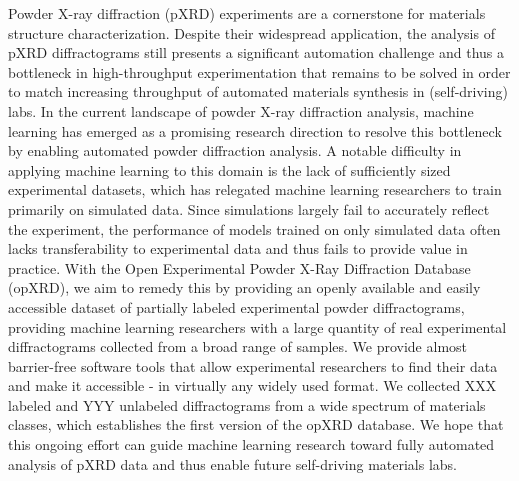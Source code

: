 Powder X-ray diffraction (pXRD) experiments are a cornerstone for materials structure characterization.
Despite their widespread application, the analysis of pXRD diffractograms still presents a significant automation challenge and thus a bottleneck in high-throughput experimentation that remains to be solved in order to match increasing throughput of automated materials synthesis in (self-driving) labs.
In the current landscape of powder X-ray diffraction analysis, machine learning has emerged as a promising research direction to resolve this bottleneck by enabling automated powder diffraction analysis.
A notable difficulty in applying machine learning to this domain is the lack of sufficiently sized experimental datasets, which has relegated machine learning researchers to train primarily on simulated data. Since simulations largely fail to accurately reflect the experiment, the performance of models trained on only simulated data often lacks transferability to experimental data and thus fails to provide value in practice.
With the Open Experimental Powder X-Ray Diffraction Database (opXRD), we aim to remedy this by providing an openly available and easily accessible dataset of partially labeled experimental powder diffractograms, providing machine learning researchers with a large quantity of real experimental diffractograms collected from a broad range of samples.
We provide almost barrier-free software tools that allow experimental researchers to find their data and make it accessible - in virtually any widely used format.
We collected XXX labeled and YYY unlabeled diffractograms from a wide spectrum of materials classes, which establishes the first version of the opXRD database.
We hope that this ongoing effort can guide machine learning research toward fully automated analysis of pXRD data and thus enable future self-driving materials labs.